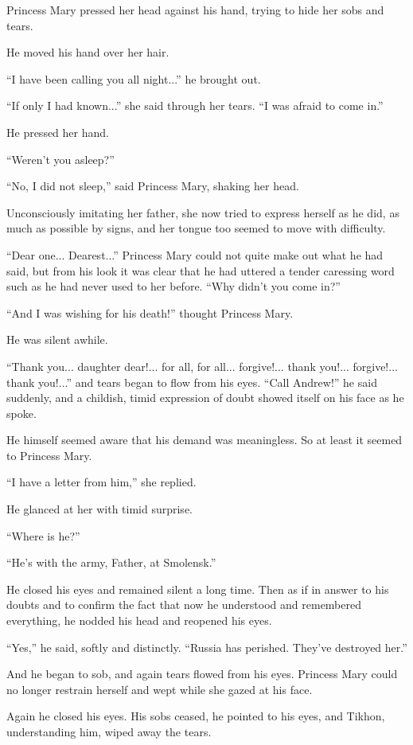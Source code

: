 Princess Mary pressed her head against his hand, trying to hide
her sobs and tears.

He moved his hand over her hair.

``I have been calling you all night...'' he brought out.

``If only I had known...'' she said through her tears. ``I was
afraid to come in.''

He pressed her hand.

``Weren't you asleep?''

``No, I did not sleep,'' said Princess Mary, shaking her head.

Unconsciously imitating her father, she now tried to express
herself as he did, as much as possible by signs, and her tongue
too seemed to move with difficulty.

``Dear one... Dearest...'' Princess Mary could not quite make out
what he had said, but from his look it was clear that he had
uttered a tender caressing word such as he had never used to her
before. ``Why didn't you come in?''

``And I was wishing for his death!'' thought Princess Mary.

He was silent awhile.

``Thank you... daughter dear!... for all, for
all... forgive!... thank you!... forgive!... thank you!...'' and
tears began to flow from his eyes. ``Call Andrew!'' he said
suddenly, and a childish, timid expression of doubt showed itself
on his face as he spoke.

He himself seemed aware that his demand was meaningless. So at
least it seemed to Princess Mary.

``I have a letter from him,'' she replied.

He glanced at her with timid surprise.

``Where is he?''

``He's with the army, Father, at Smolensk.''

He closed his eyes and remained silent a long time. Then as if in
answer to his doubts and to confirm the fact that now he
understood and remembered everything, he nodded his head and
reopened his eyes.

``Yes,'' he said, softly and distinctly. ``Russia has
perished. They've destroyed her.''

And he began to sob, and again tears flowed from his
eyes. Princess Mary could no longer restrain herself and wept
while she gazed at his face.

Again he closed his eyes. His sobs ceased, he pointed to his
eyes, and Tikhon, understanding him, wiped away the tears.

